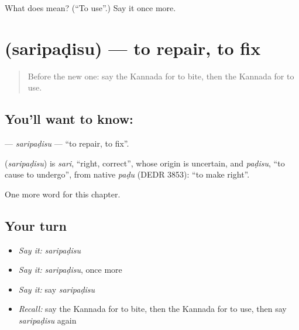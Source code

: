 \begin{tcolorbox}[breakable,colback=teal!4,colframe=teal!35!black,title={Before you move on}]
What does  mean? (\textquotedblleft{}To use\textquotedblright{}.) Say it once more.
\end{tcolorbox}
\section[\texorpdfstring{\kn{ಸರಿಪಡಿಸು} (saripaḍisu)}{ಸರಿಪಡಿಸು (saripaḍisu)}]{ (saripaḍisu) — to repair, to fix}

\label{lesson:KA-C237-saripadisu}



\begin{quote}
Before the new one: say the Kannada for to bite, then the Kannada for to use.
\end{quote}

\subsection*{You'll want to know: }
\textbf{} — \emph{saripaḍisu} — \textquotedblleft{}to repair, to fix\textquotedblright{}.

\begin{cousinweb}
\textbf{} (\emph{saripaḍisu}) is \emph{sari}, \textquotedblleft{}right, correct\textquotedblright{}, whose origin is uncertain, and \emph{paḍisu}, \textquotedblleft{}to cause to undergo\textquotedblright{}, from native \emph{paḍu} (DEDR 3853): \textquotedblleft{}to make right\textquotedblright{}.
\end{cousinweb}

\begin{grammarlens}[title={What you've built}]
One more word for this chapter.
\end{grammarlens}

\subsection*{Your turn}
\begin{itemize}
\raggedright
  \item \emph{Say it:} \emph{saripaḍisu}
  \item \emph{Say it:} \emph{saripaḍisu}, once more
  \item \emph{Say it:} say \emph{saripaḍisu}
  \item \emph{Recall:} say the Kannada for to bite, then the Kannada for to use, then say \emph{saripaḍisu} again
\end{itemize}


